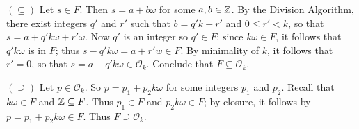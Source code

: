 \begin{enumerate}
      $(\subseteq)$ Let $s \in F$. Then $s = a + b\omega$ for some
      $a, b \in \mathbb{Z}$. By the Division Algorithm, there exist integers $q'$ and 
      $r'$ such that $b = q'k + r'$ and $0 \le r' < k$, so that
      $s = a + q'k\omega + r'\omega$. Now $q'$ is an integer so $q' \in F$; 
      since $k\omega \in F$, it follows that $q'k\omega$ is in $F$; thus
      $s - q'k\omega = a + r'w \in F$. By minimality of $k$, it follows that
      $r' = 0$, so that $s = a + q'k\omega \in \mathcal{O}_k$. Conclude that
      $F \subseteq \mathcal{O}_k$.

      $(\supseteq)$ Let $p \in \mathcal{O}_k$. So $p = p_1 + p_2k\omega$ for
      some integers $p_1$ and $p_2$. Recall that $k\omega \in F$ and
      $\mathbb{Z} \subseteq F$. Thus $p_1 \in F$ and $p_2k\omega \in F$; by closure, it
      follows by $p = p_1 + p_2k\omega \in F$. Thus $F \supseteq \mathcal{O}_k$.


\end{enumerate}
